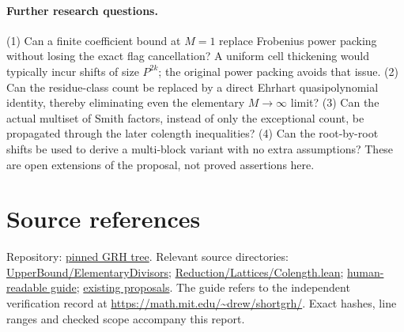 \documentclass[11pt]{article}
\theoremstyle{remark}\newtheorem{remark}[theorem]{Remark}
\begin{document}
\paragraph{Further research questions.}
(1) Can a finite coefficient bound at $M=1$ replace Frobenius power packing without losing the exact flag cancellation? A uniform cell thickening would typically incur shifts of size $P^{2k}$; the original power packing avoids that issue. (2) Can the residue-class count be replaced by a direct Ehrhart quasipolynomial identity, thereby eliminating even the elementary $M\to\infty$ limit? (3) Can the actual multiset of Smith factors, instead of only the exceptional count, be propagated through the later colength inequalities? (4) Can the root-by-root shifts be used to derive a multi-block variant with no extra assumptions? These are open extensions of the proposal, not proved assertions here.

\section*{Source references}
\small
Repository: \href{https://github.com/VladimirReshetnikov/ProveIt/tree/cdecfeba5d834fbf2f97de71cc7766b58ec4520e/Analysis/GeneralizedRiemannHypothesis}{pinned GRH tree}. Relevant source directories: \href{https://github.com/VladimirReshetnikov/ProveIt/tree/cdecfeba5d834fbf2f97de71cc7766b58ec4520e/Analysis/GeneralizedRiemannHypothesis/Lean/grh/src/New/UpperBound/ElementaryDivisors}{UpperBound/ElementaryDivisors}; \href{https://github.com/VladimirReshetnikov/ProveIt/blob/cdecfeba5d834fbf2f97de71cc7766b58ec4520e/Analysis/GeneralizedRiemannHypothesis/Lean/grh/src/New/Reduction/Lattices/Colength.lean}{Reduction/Lattices/Colength.lean}; \href{https://github.com/VladimirReshetnikov/ProveIt/tree/cdecfeba5d834fbf2f97de71cc7766b58ec4520e/Analysis/GeneralizedRiemannHypothesis/docs/guide}{human-readable guide}; \href{https://github.com/VladimirReshetnikov/ProveIt/tree/cdecfeba5d834fbf2f97de71cc7766b58ec4520e/Analysis/GeneralizedRiemannHypothesis/docs/proposals}{existing proposals}. The guide refers to the independent verification record at \url{https://math.mit.edu/~drew/shortgrh/}. Exact hashes, line ranges and checked scope accompany this report.
\end{document}
